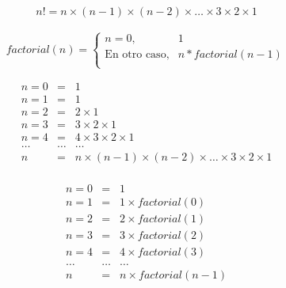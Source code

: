 \documentclass[12pt,letterpaper]{article}
\begin{document}
\begin{eqnarray*}
  n! = n \times (n - 1) \times (n - 2) \times \ldots \times 3 \times 2 \times 1
\end{eqnarray*}

\[
  factorial(n) =
  \begin{cases}
    n = 0 , & 1 \\
    \text{En otro caso}, & n * factorial(n - 1) \\
  \end{cases}
\]

\begin{eqnarray*}
  n = 0 & = & 1\\
  n = 1 & = & 1 \\
  n = 2 & = & 2 \times 1\\
  n = 3 & = & 3 \times 2 \times 1 \\
  n = 4 & = & 4 \times 3 \times 2 \times 1 \\
  \ldots & \ldots & \ldots \\
  n     & = & n \times (n - 1) \times (n - 2) \times \ldots \times 3 \times 2 \times 1 \\
\end{eqnarray*}



\begin{eqnarray*}
  n = 0 & = & 1\\
  n = 1 & = & 1 \times factorial(0) \\
  n = 2 & = & 2 \times factorial(1)\\
  n = 3 & = & 3 \times factorial(2) \\
  n = 4 & = & 4 \times factorial(3) \\
  \ldots & \ldots & \ldots \\
  n     & = & n \times factorial(n - 1) \\
\end{eqnarray*}


\end{document}
